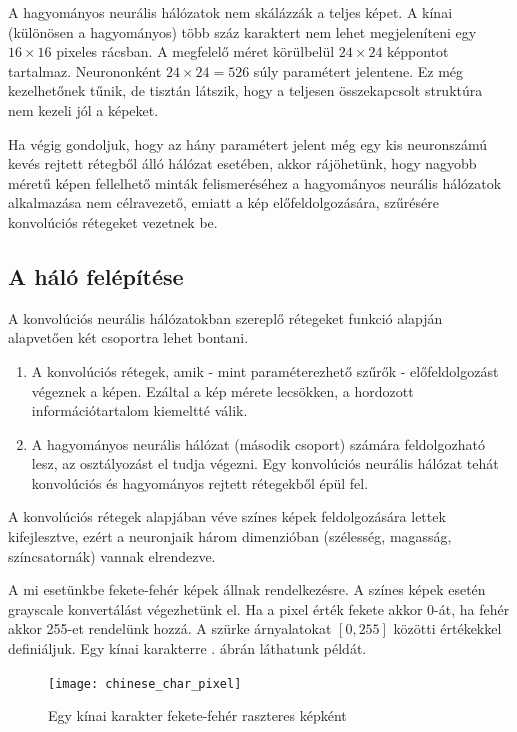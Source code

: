 A hagyományos neurális hálózatok nem skálázzák a teljes képet. A kínai (különösen a hagyományos) több száz karaktert nem lehet megjeleníteni egy $16 \times 16$ pixeles rácsban. A megfelelő méret körülbelül $24 \times 24$ képpontot tartalmaz. Neurononként $24 \times 24 = 526$ súly paramétert jelentene. Ez még kezelhetőnek tűnik, de tisztán látszik, hogy a teljesen összekapcsolt struktúra nem kezeli jól a képeket.

Ha végig gondoljuk, hogy az hány paramétert jelent még egy kis neuronszámú kevés rejtett rétegből álló hálózat esetében, akkor rájöhetünk, hogy nagyobb méretű képen fellelhető minták felismeréséhez a hagyományos neurális hálózatok alkalmazása nem célravezető, emiatt a kép előfeldolgozására, szűrésére konvolúciós rétegeket vezetnek be.

\subsection{A háló felépítése}

A konvolúciós neurális hálózatokban szereplő rétegeket funkció alapján alapvetően két csoportra lehet bontani.

\begin{enumerate}
\item A konvolúciós rétegek, amik - mint paraméterezhető szűrők - előfeldolgozást végeznek a képen. Ezáltal a kép mérete lecsökken, a hordozott információtartalom kiemeltté válik.
\item A hagyományos neurális hálózat (második csoport) számára feldolgozható lesz, az osztályozást el tudja végezni. Egy konvolúciós neurális hálózat tehát konvolúciós és hagyományos rejtett rétegekből épül fel.
\end{enumerate}

A konvolúciós rétegek alapjában véve színes képek feldolgozására lettek kifejlesztve, ezért a neuronjaik három dimenzióban (szélesség, magasság, színcsatornák) vannak elrendezve.

A mi esetünkbe fekete-fehér képek állnak rendelkezésre. A színes képek esetén grayscale konvertálást végezhetünk el. Ha a pixel érték fekete akkor 0-át, ha fehér akkor 255-et rendelünk hozzá. A szürke árnyalatokat $[0, 255]$ közötti értékekkel definiáljuk. Egy kínai karakterre . ábrán láthatunk példát.

\begin{figure}
\centering
\texttt{[image: chinese\_char\_pixel]}
\caption{Egy kínai karakter fekete-fehér raszteres képként}
\label{fig:chinese_char_pixel}
\end{figure}

